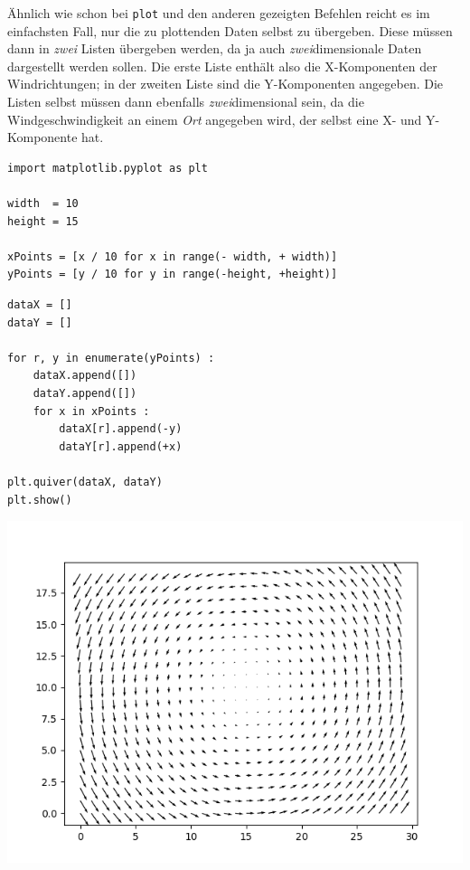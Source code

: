 Ähnlich wie schon bei \texttt{plot} und den anderen gezeigten Befehlen reicht es im einfachsten Fall, nur die zu plottenden Daten selbst zu übergeben. Diese müssen dann in \emph{zwei} Listen übergeben werden, da ja auch \emph{zwei}dimensionale Daten dargestellt werden sollen. Die erste Liste enthält also die X-Komponenten der Windrichtungen; in der zweiten Liste sind die Y-Komponenten angegeben. Die Listen selbst müssen dann ebenfalls \emph{zwei}dimensional sein, da die Windgeschwindigkeit an einem \emph{Ort} angegeben wird, der selbst eine X- und Y-Komponente hat.

\begin{codebox}
\begin{verbatim}
import matplotlib.pyplot as plt

width  = 10
height = 15

xPoints = [x / 10 for x in range(- width, + width)]
yPoints = [y / 10 for y in range(-height, +height)]
\end{verbatim}
\end{codebox}
%
\begin{codebox}[]
\begin{verbatim}
dataX = []
dataY = []

for r, y in enumerate(yPoints) :
    dataX.append([])
    dataY.append([])
    for x in xPoints :
        dataX[r].append(-y)
        dataY[r].append(+x)

plt.quiver(dataX, dataY)
plt.show()
\end{verbatim}
\end{codebox}

\begin{tcolorbox}[title=Plot: Wirbelfeld]
\begin{center}
	\includegraphics[width=.6\linewidth]{./gfx/plt-vortex}
\end{center}
\end{tcolorbox}


